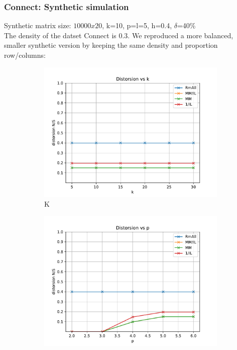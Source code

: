 \documentclass{beamer}
\begin{document}
\begin{frame}[fragile]
\frametitle{Connect: Synthetic simulation}
Synthetic matrix size: $10000x20$, k=10, p=l=5, h=0.4, $\delta$=40\% \\
The density of the datset Connect is 0.3. We reproduced a more balanced, smaller synthetic version by keeping the same density and proportion row/columns:\\

\begin{figure}
    \begin{subfigure}[a]{0.32\linewidth}
        \centering
            \includegraphics[width=\linewidth]{img/plt_ds_x10000_y20_d03_k_}
            \caption{K}\label{fig1a}
    \end{subfigure}
    \begin{subfigure}[b]{0.32\linewidth}
        \centering
            \includegraphics[width=\linewidth]{img/plt_ds_x10000_y20_d03_p_}

\end{subfigure}
\end{figure}
\end{frame}
\end{document}

